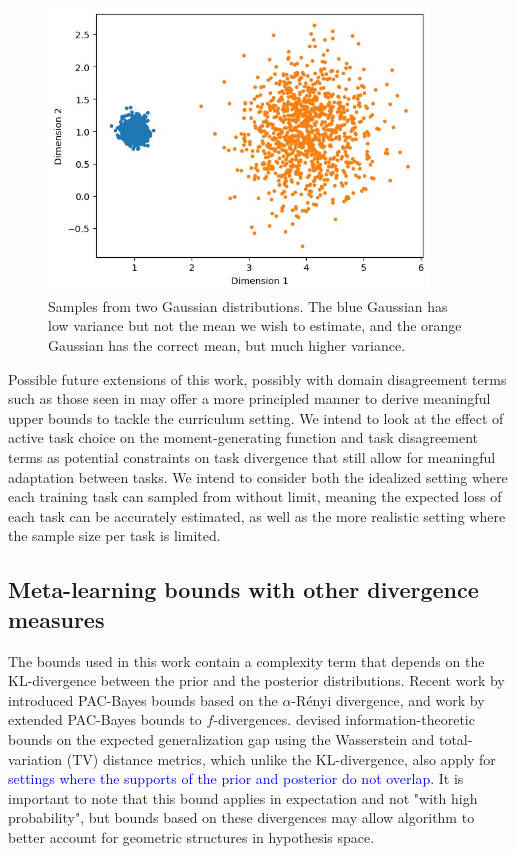 \documentclass{article}
\theoremstyle{definition}
\newcommand{\LFe}[1]{\textcolor{blue}{#1}}
\begin{document}
\begin{figure}
	\centering
	\includegraphics[width=0.9\textwidth]{cl_example.JPG}
	\caption{Samples from two Gaussian distributions. The blue Gaussian has low variance but not the mean we wish to estimate, and the orange Gaussian has the correct mean, but much higher variance.}
	\label{fig:cl_demo}
\end{figure}

Possible future extensions of this work, possibly with domain disagreement terms such as those seen in \citet{Germain2020} may offer a more principled manner to derive meaningful upper bounds to tackle the curriculum setting. We intend to look at the effect of active task choice on the moment-generating function and task disagreement terms as potential constraints on task divergence that still allow for meaningful adaptation between tasks. We intend to consider both the idealized setting where each training task can sampled from without limit, meaning the expected loss of each task can be accurately estimated, as well as the more realistic setting where the sample size per task is limited.

\subsection{Meta-learning bounds with other divergence measures}

The bounds used in this work contain a complexity term that depends on the KL-divergence between the prior and the posterior distributions. Recent work by \citet{Begin2016} introduced PAC-Bayes bounds based on the $\alpha$-R\'{e}nyi divergence, and work by \citet{Ohnishi2020} extended PAC-Bayes bounds to $f$-divergences. \citet{Lugosi2022} devised information-theoretic bounds on the expected generalization gap using the Wasserstein and total-variation (TV) distance metrics, which unlike the KL-divergence, also apply for \LFe{settings where the supports of the prior and posterior do not overlap}. It is important to note that this bound applies in expectation and not "with high probability", but bounds based on these divergences may allow algorithm to better account for geometric structures in hypothesis space.
\end{document}
